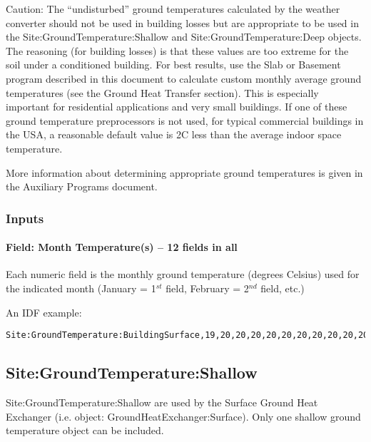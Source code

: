 \begin{callout}
Caution: The ``undisturbed'' ground temperatures calculated by the weather converter should not be used in building losses but are appropriate to be used in the Site:GroundTemperature:Shallow and Site:GroundTemperature:Deep objects. The reasoning (for building losses) is that these values are too extreme for the soil under a conditioned building. For best results, use the Slab or Basement program described in this document to calculate custom monthly average ground temperatures (see the Ground Heat Transfer section). This is especially important for residential applications and very small buildings. If one of these ground temperature preprocessors is not used, for typical commercial buildings in the USA, a reasonable default value is 2C less than the average indoor space temperature.
\end{callout}

More information about determining appropriate ground temperatures is given in the Auxiliary Programs document.

\subsubsection{Inputs}\label{inputs-11-008}

\paragraph{Field: Month Temperature(s) -- 12 fields in all}\label{field-month-temperatures-12-fields-in-all}

Each numeric field is the monthly ground temperature (degrees Celsius) used for the indicated month (January = 1\(^{st}\) field, February = 2\(^{nd}\) field, etc.)

An IDF example:

\begin{lstlisting}
Site:GroundTemperature:BuildingSurface,19,20,20,20,20,20,20,20,20,20,20,20;
\end{lstlisting}

\subsection{Site:GroundTemperature:Shallow}\label{sitegroundtemperatureshallow}

Site:GroundTemperature:Shallow are used by the Surface Ground Heat Exchanger (i.e. object: GroundHeatExchanger:Surface). Only one shallow ground temperature object can be included.

